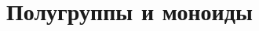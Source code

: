 \documentclass[../main/document.tex]{subfiles}
\begin{document}
\section{Полугруппы и моноиды}
\end{document}

